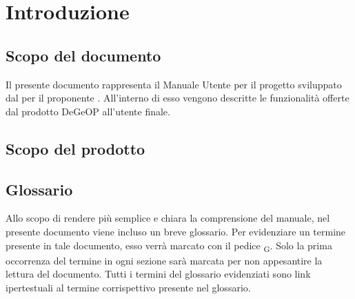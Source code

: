 \newpage

\section{Introduzione}
	\subsection{Scopo del documento}
	Il presente documento rappresenta il Manuale Utente per il progetto \progetto{} sviluppato dal  \zephyrus{} per il proponente \riskapp.
	All'interno di esso vengono descritte le funzionalità offerte dal prodotto DeGeOP all'utente finale.
	
	\subsection{Scopo del prodotto}	\introScopo
	
	\subsection{Glossario}
	Allo scopo di rendere più semplice e chiara la comprensione del manuale, nel presente documento viene incluso un breve glossario.
	Per evidenziare un termine presente in tale documento, esso verrà marcato con il pedice \textsubscript{G}. Solo la prima occorrenza del termine in ogni sezione sarà marcata per non appesantire la lettura del documento.
	Tutti i termini del glossario evidenziati sono link ipertestuali al termine corrispettivo presente nel glossario.